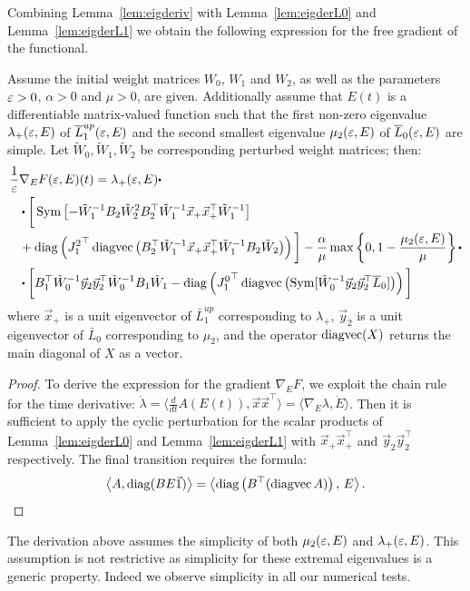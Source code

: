   Combining Lemma~\ref{lem:eigderiv} with  Lemma~\ref{lem:eigderL0} and Lemma~\ref{lem:eigderL1} we 
  obtain the following expression for the free gradient of the functional.
  \begin{theorem}
    \label{thm:fk_grad}
    Assume the initial weight matrices $W_0$, $W_1$ and $W_2$,  as well as the parameters $\varepsilon>0$, $\alpha>0$ and $\mu>0$, are given. 
    Additionally assume that $E(t)$ is a differentiable matrix-valued function such that the first non-zero eigenvalue $\lambda_+(\varepsilon, E)$ of $\overline{L}_1^{up}(\varepsilon, E)$ and the second smallest eigenvalue $\mu_2(\varepsilon, E)$ of $\overline{L}_0(\varepsilon, E)$  are simple.  Let $\tilde W_0, \tilde W_1, \tilde W_2$ be corresponding perturbed weight matrices; then: 
   \begin{equation*}
        \begin{aligned}
      \frac{1}{\eps} & \nabla_{E}  F(\eps, E)(t)   = \lambda_+(\eps,E) \bigcdot \\
      & \bigcdot \bigg[ \Sym \left[  - \tilde W_1^{-1} B_2 \tilde W_2^2 B_2^\top \tilde W_1^{-1} \vec x_+ \vec x_+^\top \tilde W_1^{-1}     \right]  \\  &+ \diag \left(  {J_1^2}^\top \vect \left( B_2^\top \tilde W_1^{-1} \vec x_+ \vec x_+^\top \tilde W_1^{-1} B_2 \tilde W_2   \right)   \right) \bigg] - \frac{\alpha}{\mu} \max \left\{ 0, 1- \frac{\mu_2(\eps, E)}{\mu }\right\}  \bigcdot \\
      & \bigcdot \bigg[  B_1^\top \tilde W_0^{-1} \vec y_2 \vec y_2^\top \tilde W_0^{-1} B_1 \tilde W_1    - \diag \left( {J_1^0}^\top  \vect \left( \Sym[ \tilde W_0^{-1} \vec y_2 \vec y_2^\top \bar L_0 ] \right) \right) \bigg]
    \end{aligned} 
   \end{equation*}
    where $\vec x_+$ is a unit eigenvector of $\bar L_1^{up}$ corresponding to $\lambda_+$,  $\vec y_2$ is a unit eigenvector of $\bar L_0$ corresponding to $\mu_2$, and the operator $\operatorname*{\mathrm{diagvec}} (X)$ returns the main diagonal of $X$ as a vector. 
  \end{theorem}
  \begin{proof}
  To derive the expression for the gradient $\nabla_E F$, we exploit the chain rule for the time derivative: $\dot \lambda = \langle \frac{d}{dt} A(E(t)), \vec x \vec x^\top  \rangle = \langle \nabla_E \lambda, \dot E \rangle$. Then it is sufficient to apply the cyclic perturbation for the scalar products of Lemma~\ref{lem:eigderL0} and Lemma~\ref{lem:eigderL1} with $\vec x_+ \vec x_+^\top$ and $\vec y_2 \vec y_2^\top$ respectively. The final transition requires the formula:
   \begin{equation*}
     \left\langle A, \operatorname{diag}(B E \vec 1) \right\rangle = \left\langle {\operatorname{diag}\left(   B^\top (\operatorname*{\mathrm{diagvec}}A) \right) ,\, E} \right\rangle.
   \end{equation*}
  \end{proof}
  \begin{remark}
    The derivation above assumes the simplicity of both $\mu_2(\varepsilon,E)$ and $\lambda_+(\varepsilon,E)$. This assumption is not restrictive as simplicity for these extremal eigenvalues is a generic property. 
    Indeed we observe simplicity in all our numerical tests.  
  \end{remark}
  
